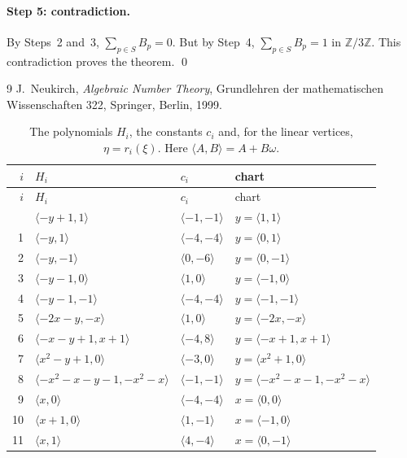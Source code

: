 \documentclass[11pt]{article}
\newcommand{\Z}{\mathbb{Z}}
\begin{document}
\paragraph{Step 5: contradiction.} By Steps~2 and~3, $\sum_{p\in S}B_p=0$. But by Step~4, $\sum_{p\in S}B_p=1$ in $\Z/3\Z$. This contradiction proves the theorem.
\qed


\begin{thebibliography}{9}
 J.~Neukirch, \emph{Algebraic Number Theory}, Grundlehren der mathematischen Wissenschaften 322, Springer, Berlin, 1999.
\end{thebibliography}

\clearpage
\begingroup\small
\setlength{\LTcapwidth}{\textwidth}
\begin{longtable}{@{}rlll@{}}
\caption{The polynomials $H_i$, the constants $c_i$ and, for the linear vertices, $\eta=r_i(\xi)$. Here $\langle A,B\rangle=A+B\omega$.}\label{tab:vert1}\\
\hline $i$ & $H_i$ & $c_i$ & chart\\\hline\endfirsthead\hline $i$ & $H_i$ & $c_i$ & chart\\\hline\endhead\hline\endfoot
0 & $\langle -y+1,1\rangle$ & $\langle -1,-1\rangle$ & $y=\langle 1,1\rangle$\\
1 & $\langle -y,1\rangle$ & $\langle -4,-4\rangle$ & $y=\langle 0,1\rangle$\\
2 & $\langle -y,-1\rangle$ & $\langle 0,-6\rangle$ & $y=\langle 0,-1\rangle$\\
3 & $\langle -y-1,0\rangle$ & $\langle 1,0\rangle$ & $y=\langle -1,0\rangle$\\
4 & $\langle -y-1,-1\rangle$ & $\langle -4,-4\rangle$ & $y=\langle -1,-1\rangle$\\
5 & $\langle -2x-y,-x\rangle$ & $\langle 1,0\rangle$ & $y=\langle -2x,-x\rangle$\\
6 & $\langle -x-y+1,x+1\rangle$ & $\langle -4,8\rangle$ & $y=\langle -x+1,x+1\rangle$\\
7 & $\langle x^{2}-y+1,0\rangle$ & $\langle -3,0\rangle$ & $y=\langle x^{2}+1,0\rangle$\\
8 & $\langle -x^{2}-x-y-1,-x^{2}-x\rangle$ & $\langle -1,-1\rangle$ & $y=\langle -x^{2}-x-1,-x^{2}-x\rangle$\\
9 & $\langle x,0\rangle$ & $\langle -4,-4\rangle$ & $x=\langle 0,0\rangle$\\
10 & $\langle x+1,0\rangle$ & $\langle 1,-1\rangle$ & $x=\langle -1,0\rangle$\\
11 & $\langle x,1\rangle$ & $\langle 4,-4\rangle$ & $x=\langle 0,-1\rangle$\\

\end{longtable}
\end{document}
